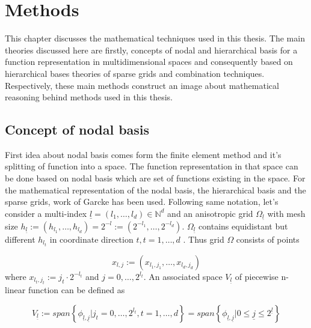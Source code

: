 \chapter{Methods}
\label{chapter:methods}
This chapter discusses the mathematical techniques used in this thesis. The main theories discussed here are firstly, concepts of nodal and hierarchical basis for a function representation in multidimensional spaces and consequently based on hierarchical bases theories of sparse grids and combination techniques. Respectively, these main methods construct an image about mathematical reasoning behind methods used in this thesis.

\section{Concept of nodal basis}
First idea about nodal basis comes form the finite element method and it's splitting of function into a space. The function representation in that space can be done based on nodal basis which are set of functions existing in the space. For the mathematical representation of the nodal basis, the hierarchical basis and the sparse grids, work of Garcke \cite{Garcke2013} has been used. Following same notation, let's consider a multi-index $\underline{l} = (l_{1}, \dots, l_{d}) \in \mathbb{N}^{d}$ and an anisotropic grid $\Omega_{\underline{l}}$ with mesh size $h_{\underline{l}} := \left( h_{l_{1}}, \dots, h_{l_{d}}  \right) = 2^{-l} := \left( 2^{-l_{1}}, \dots, 2^{-l_{d}} \right)$.
$\Omega_{\underline{l}}$ contains equidistant but different $h_{l_{t}}$ in coordinate direction $t, t = 1,\dots,d$ . Thus grid $\Omega$ consists of points

\begin{equation}
    x_{l,j} := (x_{l_{1},j_{1}}, \dots ,x_{l_{d},j_{d}})
\end{equation}
where \( x_{l_{t},j_{t}} := j_{t}\cdot 2^{-l_{t}}\) and \( j = 0,\dots,2^{l_{t}} \). An associated space $V_{\underline{l}}$ of piecewise n-linear function can be defined as  

\begin{equation}
    V_{\underline{l}} := span\left\{\phi_{\underline{l},\underline{j}}| j_{t} = 0,\dots,2^{l_{t}} , t = 1,\dots,d \right\} = span\left\{\phi_{\underline{l},\underline{j}}| 0 \leq \underline{j} \leq 2^{\underline{l}} \right\}
\end{equation}

